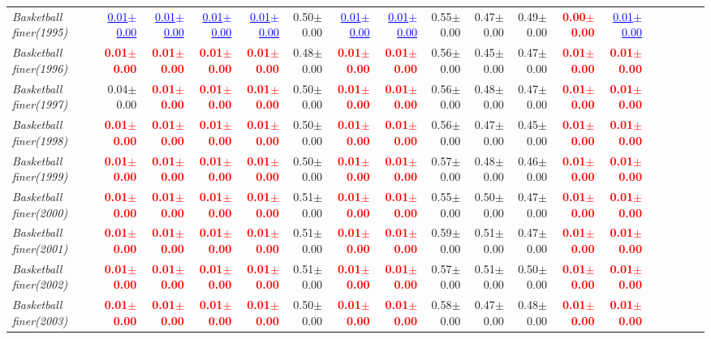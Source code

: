 \documentclass[nohyperref]{article}
\theoremstyle{plain}
\theoremstyle{definition}
\theoremstyle{remark}
\newcommand{\red}[1]{\textcolor{red}{\textbf{#1}}}
\newcommand{\blue}[1]{\textcolor{blue}{\underline{#1}}}
\begin{document}
\begin{table*}[!ht]
{\begin{tabular}{lrrrrrrrrrrrrrrrrr}
			{\it Basketball finer(1995)} & \blue{0.01$\pm$0.00} & \blue{0.01$\pm$0.00} & \blue{0.01$\pm$0.00} & \blue{0.01$\pm$0.00} & 0.50$\pm$0.00 & \blue{0.01$\pm$0.00} & \blue{0.01$\pm$0.00} & 0.55$\pm$0.00 & 0.47$\pm$0.00 & 0.49$\pm$0.00 & \red{0.00$\pm$0.00} & \blue{0.01$\pm$0.00} \\
			{\it Basketball finer(1996)} & \red{0.01$\pm$0.00} & \red{0.01$\pm$0.00} & \red{0.01$\pm$0.00} & \red{0.01$\pm$0.00} & 0.48$\pm$0.00 & \red{0.01$\pm$0.00} & \red{0.01$\pm$0.00} & 0.56$\pm$0.00 & 0.45$\pm$0.00 & 0.47$\pm$0.00 & \red{0.01$\pm$0.00} & \red{0.01$\pm$0.00} \\
			{\it Basketball finer(1997)} & 0.04$\pm$0.00 & \red{0.01$\pm$0.00} & \red{0.01$\pm$0.00} & \red{0.01$\pm$0.00} & 0.50$\pm$0.00 & \red{0.01$\pm$0.00} & \red{0.01$\pm$0.00} & 0.56$\pm$0.00 & 0.48$\pm$0.00 & 0.47$\pm$0.00 & \red{0.01$\pm$0.00} & \red{0.01$\pm$0.00} \\
			{\it Basketball finer(1998)} & \red{0.01$\pm$0.00} & \red{0.01$\pm$0.00} & \red{0.01$\pm$0.00} & \red{0.01$\pm$0.00} & 0.50$\pm$0.00 & \red{0.01$\pm$0.00} & \red{0.01$\pm$0.00} & 0.56$\pm$0.00 & 0.47$\pm$0.00 & 0.45$\pm$0.00 & \red{0.01$\pm$0.00} & \red{0.01$\pm$0.00} \\
			{\it Basketball finer(1999)} & \red{0.01$\pm$0.00} & \red{0.01$\pm$0.00} & \red{0.01$\pm$0.00} & \red{0.01$\pm$0.00} & 0.50$\pm$0.00 & \red{0.01$\pm$0.00} & \red{0.01$\pm$0.00} & 0.57$\pm$0.00 & 0.48$\pm$0.00 & 0.46$\pm$0.00 & \red{0.01$\pm$0.00} & \red{0.01$\pm$0.00} \\
			{\it Basketball finer(2000)} & \red{0.01$\pm$0.00} & \red{0.01$\pm$0.00} & \red{0.01$\pm$0.00} & \red{0.01$\pm$0.00} & 0.51$\pm$0.00 & \red{0.01$\pm$0.00} & \red{0.01$\pm$0.00} & 0.55$\pm$0.00 & 0.50$\pm$0.00 & 0.47$\pm$0.00 & \red{0.01$\pm$0.00} & \red{0.01$\pm$0.00} \\
			{\it Basketball finer(2001)} & \red{0.01$\pm$0.00} & \red{0.01$\pm$0.00} & \red{0.01$\pm$0.00} & \red{0.01$\pm$0.00} & 0.51$\pm$0.00 & \red{0.01$\pm$0.00} & \red{0.01$\pm$0.00} & 0.59$\pm$0.00 & 0.51$\pm$0.00 & 0.47$\pm$0.00 & \red{0.01$\pm$0.00} & \red{0.01$\pm$0.00} \\
			{\it Basketball finer(2002)} & \red{0.01$\pm$0.00} & \red{0.01$\pm$0.00} & \red{0.01$\pm$0.00} & \red{0.01$\pm$0.00} & 0.51$\pm$0.00 & \red{0.01$\pm$0.00} & \red{0.01$\pm$0.00} & 0.57$\pm$0.00 & 0.51$\pm$0.00 & 0.50$\pm$0.00 & \red{0.01$\pm$0.00} & \red{0.01$\pm$0.00} \\
			{\it Basketball finer(2003)} & \red{0.01$\pm$0.00} & \red{0.01$\pm$0.00} & \red{0.01$\pm$0.00} & \red{0.01$\pm$0.00} & 0.50$\pm$0.00 & \red{0.01$\pm$0.00} & \red{0.01$\pm$0.00} & 0.58$\pm$0.00 & 0.47$\pm$0.00 & 0.48$\pm$0.00 & \red{0.01$\pm$0.00} & \red{0.01$\pm$0.00} \\

\end{tabular}}
\end{table*}
\end{document}
